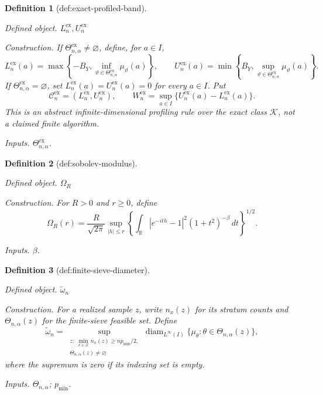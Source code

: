 \documentclass{article}
\newtheorem{definition}{Definition}
\begin{document}
\begin{definition}[def:exact-profiled-band]\label{def:exact-profiled-band}
\par\smallskip\noindent\emph{Defined object.} \(L_n^{\mathrm{ex}},U_n^{\mathrm{ex}}\)
\par\smallskip\noindent\emph{Construction.} If \(\Theta^{\mathrm{ex}}_{n,\alpha}\ne\varnothing\), define, for
\(a\in I\),
\[
 L_n^{\mathrm{ex}}(a)=
 \max\left\{-B_Y,
 \inf_{\vartheta\in\Theta^{\mathrm{ex}}_{n,\alpha}}
 \mu_\vartheta(a)\right\},
 \qquad
 U_n^{\mathrm{ex}}(a)=
 \min\left\{B_Y,
 \sup_{\vartheta\in\Theta^{\mathrm{ex}}_{n,\alpha}}
 \mu_\vartheta(a)\right\}.
\]
If \(\Theta^{\mathrm{ex}}_{n,\alpha}=\varnothing\), set
\(L_n^{\mathrm{ex}}(a)=U_n^{\mathrm{ex}}(a)=0\) for every \(a\in I\).
Put
\[
 \mathcal C_n^{\mathrm{ex}}=(L_n^{\mathrm{ex}},U_n^{\mathrm{ex}}),
 \qquad
 W_n^{\mathrm{ex}}=
 \sup_{a\in I}\{U_n^{\mathrm{ex}}(a)-L_n^{\mathrm{ex}}(a)\}.
\]
This is an abstract infinite-dimensional profiling rule over the exact class
\(\mathscr K\), not a claimed finite algorithm.
\par\smallskip\noindent\emph{Inputs.} \(\Theta^{\mathrm{ex}}_{n,\alpha}\).
\end{definition}

\begin{definition}[def:sobolev-modulus]\label{def:sobolev-modulus}
\par\smallskip\noindent\emph{Defined object.} \(\Omega_R\)
\par\smallskip\noindent\emph{Construction.} For \(R>0\) and \(r\ge 0\), define
\[
 \Omega_R(r)=\frac{R}{\sqrt{2\pi}}
 \sup_{|h|\le r}
 \left\{\int_{\mathbb R}|e^{-ith}-1|^2(1+t^2)^{-\beta}\,dt\right\}^{1/2}.
\]
\par\smallskip\noindent\emph{Inputs.} \(\beta\).
\end{definition}

\begin{definition}[def:finite-sieve-diameter]\label{def:finite-sieve-diameter}
\par\smallskip\noindent\emph{Defined object.} \(\widetilde\omega_n\)
\par\smallskip\noindent\emph{Construction.} For a realized sample \(z\), write \(n_x(z)\) for its stratum counts and \(\Theta_{n,\alpha}(z)\) for the finite-sieve feasible set. Define
\[
 \widetilde\omega_n=
 \sup_{\substack{z:\ \min_{x\in\mathcal X}n_x(z)\ge np_{\min}/2,\\
                  \Theta_{n,\alpha}(z)\ne\varnothing}}
 \operatorname{diam}_{L^\infty(I)}
 \{\mu_\theta:\theta\in\Theta_{n,\alpha}(z)\},
\]
where the supremum is zero if its indexing set is empty.
\par\smallskip\noindent\emph{Inputs.} \(\Theta_{n,\alpha}\); \(p_{\min}\).
\end{definition}
\end{document}
